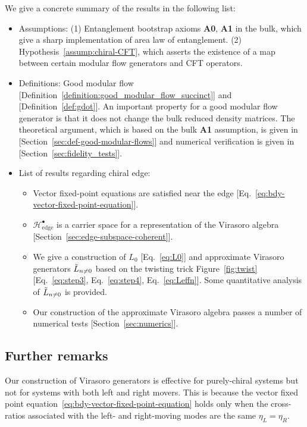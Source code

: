 \documentclass[12pt, nofootinbib]{article}
\theoremstyle{plain}
\theoremstyle{assumption}
\theoremstyle{definition}
\theoremstyle{plain}
\theoremstyle{plain}
\theoremstyle{plain}
\theoremstyle{plain}
\theoremstyle{plain}
\newcommand{\calH}{{\mathcal H}}
\begin{document}
We give a concrete summary of the results in the following list: 
\begin{itemize}
    \item Assumptions: (1) Entanglement bootstrap axioms {\bf A0}, {\bf A1} \cite{shi2020fusion} in the bulk, which give a sharp implementation of area law of entanglement. (2) Hypothesis~\ref{assump:chiral-CFT}, which asserts the existence of a map between certain modular flow generators and CFT operators.
    \item Definitions: Good modular flow [Definition~\ref{definition:good_modular_flow_succinct}] and [Definition~\ref{def:gdot}]. An important property for a good modular flow generator is that it does not change the bulk reduced density matrices. The theoretical argument, which is based on the bulk {\bf A1} assumption, is given in 
        [Section~\ref{sec:def-good-modular-flows}] and numerical verification is given in [Section~\ref{sec:fidelity_tests}].
    \item List of results regarding chiral edge: 
    \begin{itemize}
        \item Vector fixed-point equations are satisfied near the edge [Eq.~\eqref{eq:bdy-vector-fixed-point-equation}]. 
        \item $\calH_{\mathrm{edge}}^{\bullet}$ is a carrier space for a representation of the Virasoro algebra [Section~\ref{sec:edge-subspace-coherent}]. 
        \item We give a construction of $L_0$ [Eq.~\eqref{eq:L0}] and approximate Virasoro generators $\Tilde{L}_{n\neq 0}$ based on the twisting trick Figure~\ref{fig:twist} [Eq.~\eqref{eq:step3}, Eq.~\eqref{eq:step4}, Eq.~\eqref{eq:Leffn}]. Some quantitative analysis of $\Tilde{L}_{n\neq 0}$ is provided. 
        \item Our construction of the approximate Virasoro algebra passes a number of numerical tests [Section~\ref{sec:numerics}]. 
    \end{itemize}
\end{itemize}

\subsection{Further remarks}

Our construction of Virasoro generators is effective for purely-chiral systems but not for systems with both left and right movers.
This is because the vector fixed point equation~\eqref{eq:bdy-vector-fixed-point-equation} holds only when the cross-ratios associated with the left- and right-moving modes are the same $\eta_L = \eta_R$.
\end{document}
